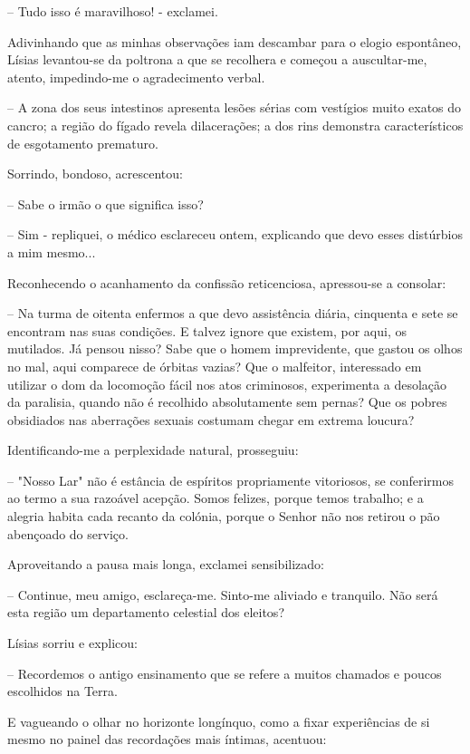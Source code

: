 \documentclass[portuguese,12pt,a4paper]{scrbook}
\begin{document}
	– Tudo isso é maravilhoso! - exclamei.
	
	Adivinhando que as minhas observações iam descambar para o elogio espontâneo, Lísias levantou-se da poltrona a que se recolhera e começou a auscultar-me, atento, impedindo-me o agradecimento verbal.
	
	
	– A zona dos seus intestinos apresenta lesões sérias com vestígios muito exatos do cancro; a região do fígado revela dilacerações; a dos rins demonstra característicos de esgotamento prematuro.
	
	Sorrindo, bondoso, acrescentou:
	
	– Sabe o irmão o que significa isso?
	
	– Sim - repliquei, o médico esclareceu ontem, explicando que devo esses distúrbios a mim mesmo...
	
	Reconhecendo o acanhamento da confissão reticenciosa, apressou-se a consolar:
	
	– Na turma de oitenta enfermos a que devo assistência diária, cinquenta e sete se encontram nas suas condições. E talvez ignore que existem, por aqui, os mutilados. Já pensou nisso? Sabe que o homem imprevidente, que gastou os olhos no mal, aqui comparece de órbitas vazias? Que o malfeitor, interessado em utilizar o dom da locomoção fácil nos atos criminosos, experimenta a desolação da paralisia, quando não é recolhido absolutamente sem pernas? Que os pobres obsidiados nas aberrações sexuais costumam chegar em extrema loucura?
	
	Identificando-me a perplexidade natural, prosseguiu:
	
	– "Nosso Lar" não é estância de espíritos propriamente vitoriosos, se conferirmos ao termo a sua razoável acepção. Somos felizes, porque temos trabalho; e a alegria habita cada recanto da colónia, porque o Senhor não nos retirou o pão abençoado do serviço.
	
	Aproveitando a pausa mais longa, exclamei sensibilizado:
	
	– Continue, meu amigo, esclareça-me. Sinto-me aliviado e tranquilo. Não será esta região um departamento celestial dos eleitos?
	
	Lísias sorriu e explicou:
	
	
	– Recordemos o antigo ensinamento que se refere a muitos chamados e poucos escolhidos na Terra.
	
	E vagueando o olhar no horizonte longínquo, como a fixar experiências de si mesmo no painel das recordações mais íntimas, acentuou:
	
\end{document}
